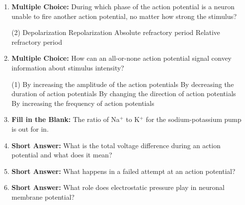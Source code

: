 \begin{enumerate}[label=\textbf{Q2.3.\arabic*}]
      \item \textbf{Multiple Choice:} During which phase of the action potential is a neuron unable to fire another action potential, no matter how strong the stimulus?
            \begin{tasks}[label=(\Alph*), label-width=1.5em, item-indent=1.7em](2)
                  \task Depolarization
                  \task Repolarization
                  \task Absolute refractory period
                  \task Relative refractory period
            \end{tasks}

      \item \textbf{Multiple Choice:} How can an all-or-none action potential signal convey information about stimulus intensity?
            \begin{tasks}[label=(\Alph*), label-width=1.5em, item-indent=1.7em](1)
                  \task By increasing the amplitude of the action potentials
                  \task By decreasing the duration of action potentials
                  \task By changing the direction of action potentials
                  \task By increasing the frequency of action potentials
            \end{tasks}

      \item \textbf{Fill in the Blank:} The ratio of Na\(^{+}\) to K\(^{+}\) for the sodium-potassium pump is \underline{\hspace{0.5cm}} out for \underline{\hspace{0.5cm}} in. \\

      \item \textbf{Short Answer:} What is the total voltage difference during an action potential and what does it mean? \\

      \item \textbf{Short Answer:} What happens in a failed attempt at an action potential? \\

      \item \textbf{Short Answer:} What role does electrostatic pressure play in neuronal membrane potential? \\


\end{enumerate}
